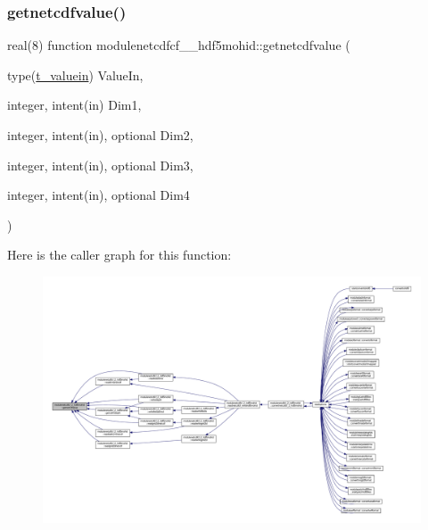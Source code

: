 \subsubsection{\texorpdfstring{getnetcdfvalue()}{getnetcdfvalue()}}
{\footnotesize\ttfamily real(8) function modulenetcdfcf\+\_\+\_\+hdf5mohid\+::getnetcdfvalue (\begin{DoxyParamCaption}\item[{type(\mbox{\hyperlink{structmodulenetcdfcf__2__hdf5mohid_1_1t__valuein}{t\+\_\+valuein}})}]{Value\+In,  }\item[{integer, intent(in)}]{Dim1,  }\item[{integer, intent(in), optional}]{Dim2,  }\item[{integer, intent(in), optional}]{Dim3,  }\item[{integer, intent(in), optional}]{Dim4 }\end{DoxyParamCaption})\hspace{0.3cm}{\ttfamily [private]}}

Here is the caller graph for this function\+:\nopagebreak
\begin{figure}[H]
\begin{center}
\leavevmode
\includegraphics[width=350pt]{namespacemodulenetcdfcf__2__hdf5mohid_a8bdc7928ff8c39c76b2c5fda4b90f2c5_icgraph}
\end{center}
\end{figure}
\mbox{\label{namespacemodulenetcdfcf__2__hdf5mohid_a9b6bf6f96a105d171c7c2487cabd5c51}} 
